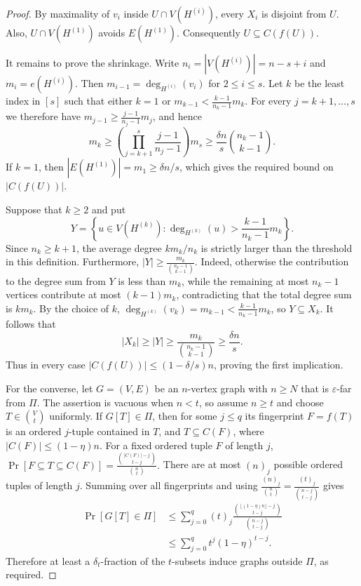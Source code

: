 \documentclass[11pt,reqno,letterpaper]{amsart}
\theoremstyle{plain}
\theoremstyle{remark}
\begin{document}
\begin{proof}
By maximality of $v_i$ inside $U\cap V(H^{(i)})$, every $X_i$ is disjoint from
$U$.  Also, $U\cap V(H^{(1)})$ avoids $E(H^{(1)})$.  Consequently
$U\subseteq C(f(U))$.

It remains to prove the shrinkage.  Write
$n_i=|V(H^{(i)})|=n-s+i$ and $m_i=e(H^{(i)})$.  Then
$m_{i-1}=\deg_{H^{(i)}}(v_i)$ for $2\leq i\leq s$.  Let $k$ be the least
index in $[s]$ such that either $k=1$ or
\(m_{k-1}<\frac{k-1}{n_k-1}m_k.\)
For every $j=k+1,\ldots,s$ we therefore have
$m_{j-1}\geq\frac{j-1}{n_j-1}m_j$, and hence
\[
m_k
\geq
\left(\prod_{j=k+1}^{s}\frac{j-1}{n_j-1}\right)m_s
\geq
\frac{\delta n}{s}\binom{n_k-1}{k-1}.
\]
If $k=1$, then $|E(H^{(1)})|=m_1\geq\delta n/s$, which gives the required
bound on $|C(f(U))|$.

Suppose that $k\geq2$ and put
\[
Y=\left\{u\in V(H^{(k)}):
\deg_{H^{(k)}}(u)>\frac{k-1}{n_k-1}m_k\right\}.
\]
Since $n_k\geq k+1$, the average degree $km_k/n_k$ is strictly larger than
the threshold in this definition.  Furthermore,
\(|Y|\geq\frac{m_k}{\binom{n_k-1}{k-1}}.\)
Indeed, otherwise the contribution to the degree sum from $Y$ is less than
$m_k$, while the remaining at most $n_k-1$ vertices contribute at most
$(k-1)m_k$, contradicting that the total degree sum is $km_k$.  By the choice
of $k$,
$\deg_{H^{(k)}}(v_k)=m_{k-1}<\frac{k-1}{n_k-1}m_k$, so
$Y\subseteq X_k$.  It follows that
\[
|X_k|\geq |Y|
\geq\frac{m_k}{\binom{n_k-1}{k-1}}
\geq\frac{\delta n}{s}.
\]
Thus in every case $|C(f(U))|\leq(1-\delta/s)n$, proving the first
implication.

For the converse, let $G=(V,E)$ be an $n$-vertex graph with $n\geq N$ that is
$\varepsilon$-far from $\Pi$.  The assertion is vacuous when $n<t$, so assume
$n\geq t$ and choose $T\in\binom Vt$ uniformly.  If $G[T]\in\Pi$, then for
some $j\leq q$ its fingerprint $F=f(T)$ is an ordered $j$-tuple contained in
$T$, and
\(T\subseteq C(F)\), where $|C(F)|\leq(1-\eta)n$.  For a fixed ordered tuple
$F$ of length $j$,
\(\Pr[F\subseteq T\subseteq C(F)] =\frac{\binom{|C(F)|-j}{t-j}}{\binom nt}.\)
There are at most $(n)_j$ possible ordered tuples of length $j$.  Summing over
all fingerprints and using
\(\frac{(n)_j}{\binom nt} =\frac{(t)_j}{\binom{n-j}{t-j}}\)
gives
\begin{align*}
\Pr[G[T]\in\Pi]
&\leq
\sum_{j=0}^{q}(t)_j
\frac{\binom{\lfloor(1-\eta)n\rfloor-j}{t-j}}
{\binom{n-j}{t-j}}\\
&\leq
\sum_{j=0}^{q}t^j(1-\eta)^{t-j}.
\end{align*}
Therefore at least a $\delta_t$-fraction of the $t$-subsets induce graphs
outside $\Pi$, as required.
\end{proof}
\end{document}

